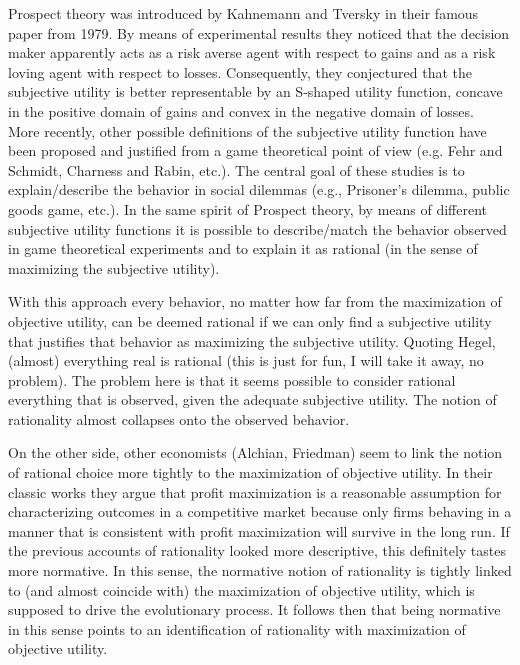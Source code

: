 \documentclass[fleqn,reqno,11pt]{article}
\begin{document}
Prospect theory was introduced by Kahnemann and Tversky in
their famous paper from 1979. By means of experimental results they noticed that the decision
maker apparently acts as a risk averse agent with respect to gains and as a risk loving agent
with respect to losses. Consequently, they conjectured that the subjective utility is better
representable by an S-shaped utility function, concave in the positive domain of gains and
convex in the negative domain of losses.
\\

More recently, other possible definitions of the subjective utility function have been proposed
and justified from a game theoretical point of view (e.g. Fehr and Schmidt, Charness and Rabin,
etc.). The central goal of these studies is to explain/describe the behavior in social dilemmas
(e.g., Prisoner's dilemma, public goods game, etc.). In the same spirit of Prospect theory, by means of different subjective utility
functions it is possible to describe/match the behavior observed in game theoretical experiments and to
explain it as rational (in the sense of maximizing the subjective utility).


With this approach every behavior, no matter how far from the maximization of
objective utility, can be deemed rational if we can only find a subjective utility that
justifies that behavior as maximizing the subjective utility. Quoting Hegel, (almost)
everything real is rational (this is just for fun, I will take it away, no problem). The problem here is that it seems possible to consider rational everything
that is observed, given the adequate subjective utility. The notion
of rationality almost collapses onto the observed behavior.

On the other side, other economists (Alchian, Friedman) seem to link the notion of rational choice
more tightly to the maximization of objective utility. In their classic works they argue that
profit maximization is a reasonable assumption for characterizing outcomes in a competitive
market because only firms behaving in a manner that is consistent with profit maximization will
survive in the long run. If the previous accounts of rationality looked more descriptive, this
definitely tastes more normative. In this sense, the normative notion of rationality is tightly
linked to (and almost coincide with) the maximization of objective utility, which is supposed
to drive the evolutionary process. It follows then that being normative in this sense points to an identification of rationality with maximization of objective utility.
\end{document}
